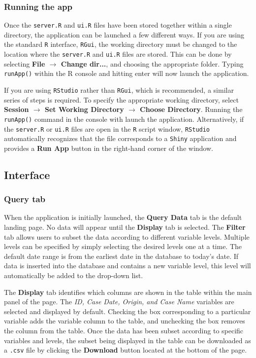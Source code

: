 \documentclass{article}
\begin{document}
\subsubsection{Running the app}
Once the {\tt server.R} and {\tt ui.R} files have been stored together within a single directory, the application can be launched a few different ways. If you are using the standard {\tt R} interface, {\tt RGui}, the working directory must be changed to the location where the {\tt server.R} and {\tt ui.R} files are stored. This can be done by selecting {\bf File $\rightarrow$ Change dir...}, and choosing the appropriate folder. Typing {\tt runApp()} within the R console and hitting enter will now launch the application. 

If you are using {\tt RStudio} rather than {\tt RGui}, which is recommended, a similar series of steps is required. To specify the appropriate working directory, select {\bf Session $\rightarrow$ Set Working Directory $\rightarrow$ Choose Directory}. Running the {\tt runApp()} command in the console with launch the application. Alternatively, if the {\tt server.R} or {\tt ui.R} files are open in the {\tt R} script window, {\tt RStudio} automatically recognizes that the file corresponds to a {\tt Shiny} application and provides a {\bf Run App} button in the right-hand corner of the window.

\subsection{Interface}


\subsubsection{Query tab}
When the application is initially launched, the {\bf Query Data} tab is the default landing page. No data will appear until the {\bf Display} tab is selected. The {\bf Filter} tab allows users to subset the data according to different variable levels. Multiple levels can be specified by simply selecting the desired levels one at a time. The default date range is from the earliest date in the database to today's date. If data is inserted into the database and contains a new variable level, this level will automatically be added to the drop-down list. 

The {\bf Display} tab identifies which columns are shown in the table within the main panel of the page. The {\it ID, Case Date, Origin, and Case Name} variables are selected and displayed by default. Checking the box corresponding to a particular variable adds the variable column to the table, and unchecking the box removes the column from the table. Once the data has been subset according to specific variables and levels, the subset being displayed in the table can be downloaded as a {\tt .csv} file by clicking the {\bf Download} button located at the bottom of the page.
\end{document}
